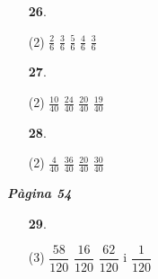 \documentclass[a4paper, pdf, twoside]{book}
\begin{document}
\begin{multicols}{2}
\begin{enumerate}

 \item[\fontfamily{phv}\selectfont\color{blue}\textbf{26}. ] 
 \begin{tasks}[column-sep=1em, item-indent=1.3333em](2)
	 \task $\frac {2}{6}$
	 \task $\frac {3}{6}$
	 \task $\frac {5}{6}$
	 \task $\frac {4}{6}$
	 \task $\frac {3}{6}$
\end{tasks}
\vspace{0.25cm}



 \item[\fontfamily{phv}\selectfont\color{blue}\textbf{27}. ] 
 \begin{tasks}[column-sep=1em, item-indent=1.3333em](2)
	 \task $\frac {10}{40}$
	 \task $\frac {24}{40}$
	 \task $\frac {20}{40}$
	 \task $\frac {19}{40}$
\end{tasks}
\vspace{0.25cm}



 \item[\fontfamily{phv}\selectfont\color{blue}\textbf{28}. ] 
 \begin{tasks}[column-sep=1em, item-indent=1.3333em](2)
	 \task $\frac {4}{40}$
	 \task $\frac {36}{40}$
	 \task $\frac {20}{40}$
	 \task $\frac {30}{40}$
\end{tasks}
 \end{enumerate}
\vspace{0.3cm}


{\textbf{\em Pàgina 54}} \hrulefill
\begin{enumerate}
\vspace{0.25cm}



 \item[\fontfamily{phv}\selectfont\color{blue}\textbf{29}. ]  \scalebox{0.6}{\simbolclau } 
 \begin{tasks}[column-sep=1em, item-indent=1.3333em](3)
	 \task $\dfrac {58}{120}$
	 \task $\dfrac {16}{120}$
	 \task* $\dfrac {62}{120}$ i $\dfrac {1}{120}$ 
\end{tasks}
 \end{enumerate}
\begin{enumerate}
\vspace{0.25cm}




\end{enumerate}
\end{multicols}
\end{document}
